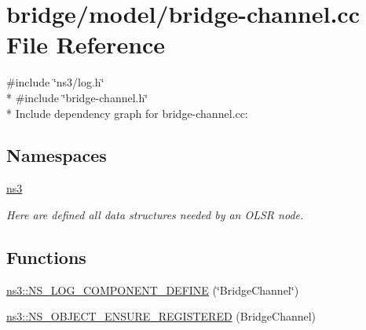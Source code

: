 \hypertarget{bridge-channel_8cc}{}\section{bridge/model/bridge-\/channel.cc File Reference}
\label{bridge-channel_8cc}
{\ttfamily \#include \char`\"{}ns3/log.\+h\char`\"{}}\\*
{\ttfamily \#include \char`\"{}bridge-\/channel.\+h\char`\"{}}\\*
Include dependency graph for bridge-\/channel.cc\+:
\subsection*{Namespaces}
\begin{DoxyCompactItemize}
\item 
 \hyperlink{namespacens3}{ns3}
\begin{DoxyCompactList}\small\item\em Here are defined all data structures needed by an O\+L\+SR node. \end{DoxyCompactList}\end{DoxyCompactItemize}
\subsection*{Functions}
\begin{DoxyCompactItemize}
\item 
\hyperlink{namespacens3_adceaf4013ac2febd4b3b8874d9c81b30}{ns3\+::\+N\+S\+\_\+\+L\+O\+G\+\_\+\+C\+O\+M\+P\+O\+N\+E\+N\+T\+\_\+\+D\+E\+F\+I\+NE} (\char`\"{}Bridge\+Channel\char`\"{})
\item 
\hyperlink{namespacens3_a041cdf7bb6e887f56122788397818ecd}{ns3\+::\+N\+S\+\_\+\+O\+B\+J\+E\+C\+T\+\_\+\+E\+N\+S\+U\+R\+E\+\_\+\+R\+E\+G\+I\+S\+T\+E\+R\+ED} (Bridge\+Channel)
\end{DoxyCompactItemize}
